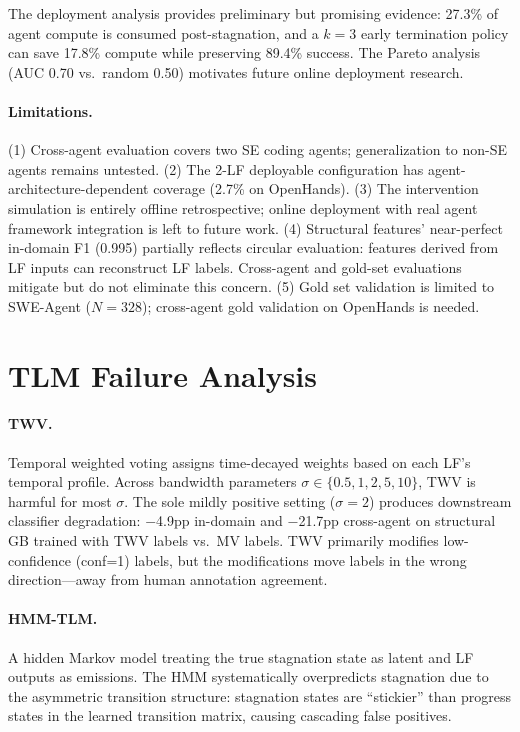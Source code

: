 \documentclass[11pt,a4paper]{article}
\begin{document}
The deployment analysis provides preliminary but promising evidence: 27.3\% of agent compute is consumed post-stagnation, and a $k{=}3$ early termination policy can save 17.8\% compute while preserving 89.4\% success. The Pareto analysis (AUC 0.70 vs.\ random 0.50) motivates future online deployment research.

\paragraph{Limitations.}
(1) Cross-agent evaluation covers two SE coding agents; generalization to non-SE agents remains untested.
(2) The 2-LF deployable configuration has agent-architecture-dependent coverage (2.7\% on OpenHands).
(3) The intervention simulation is entirely offline retrospective; online deployment with real agent framework integration is left to future work.
(4) Structural features' near-perfect in-domain F1 (0.995) partially reflects circular evaluation: features derived from LF inputs can reconstruct LF labels. Cross-agent and gold-set evaluations mitigate but do not eliminate this concern.
(5) Gold set validation is limited to SWE-Agent ($N{=}328$); cross-agent gold validation on OpenHands is needed.

\appendix
\section{TLM Failure Analysis}
\label{app:tlm}

\paragraph{TWV.} Temporal weighted voting assigns time-decayed weights based on each LF's temporal profile. Across bandwidth parameters $\sigma \in \{0.5, 1, 2, 5, 10\}$, TWV is harmful for most $\sigma$. The sole mildly positive setting ($\sigma{=}2$) produces downstream classifier degradation: $-$4.9pp in-domain and $-$21.7pp cross-agent on structural GB trained with TWV labels vs.\ MV labels. TWV primarily modifies low-confidence (conf=1) labels, but the modifications move labels in the wrong direction---away from human annotation agreement.

\paragraph{HMM-TLM.} A hidden Markov model treating the true stagnation state as latent and LF outputs as emissions. The HMM systematically overpredicts stagnation due to the asymmetric transition structure: stagnation states are ``stickier'' than progress states in the learned transition matrix, causing cascading false positives.
\end{document}
